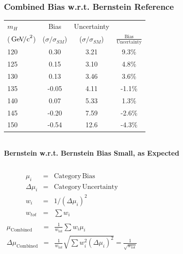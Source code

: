 \documentclass{beamer}
\newcommand{\GeVcc}{\ensuremath{\,\mathrm{Ge\kern -0.1em V\!/c}^2}}
\begin{document}
\begin{frame}
\frametitle{Combined Bias w.r.t. Bernstein Reference}
  \begin{center}
    \scriptsize
    \begin{tabular}{|l|c|c|c|} \hline
$m_H$         & Bias & Uncertainty & \\ 
(\GeVcc{})         & ($\sigma/\sigma_{SM}$) & ($\sigma/\sigma_{SM}$) & $\frac{\mathrm{Bias}}{\mathrm{Uncertainty}}$ \\ \hline \hline
120   &       0.30  &   3.21 &       9.3\%     \\ \hline
125   &       0.15  &   3.10 &       4.8\%     \\ \hline
130   &       0.13  &   3.46 &       3.6\%     \\ \hline
135   &      -0.05  &   4.11 &      -1.1\%     \\ \hline
140   &       0.07  &   5.33 &       1.3\%     \\ \hline
145   &      -0.20  &   7.59 &      -2.6\%     \\ \hline
150   &      -0.54  &  12.6  &      -4.3\%     \\ \hline
    \end{tabular}
\\ \vspace{1ex}
\normalsize
\textbf{Bernstein w.r.t. Bernstein Bias Small, as Expected}
\\ \vspace{-1em}
  \end{center}
  \begin{columns}[c]
     \column{55mm}
    \scriptsize
    \begin{eqnarray*}
      \mu_i &=& \mathrm{Category\,Bias} \\
      \Delta\mu_i &=& \mathrm{Category\,Uncertainty} \\
      w_i &=& 1/(\Delta\mu_i)^2 \\
      w_{tot} &=& \sum w_i \\
    \end{eqnarray*}
     \column{65mm}
        \scriptsize
    \begin{eqnarray*}
      \mu_{\mathrm{Combined}} &=& \frac{1}{w_{tot}} \sum w_i \mu_i \\
      \Delta\mu_{\mathrm{Combined}} &=& \frac{1}{w_{tot}} \sqrt{\sum w_i^2 (\Delta\mu_i)^2} = \frac{1}{\sqrt{w_{tot}}}
    \end{eqnarray*}
  \end{columns}
\end{frame}
\end{document}
